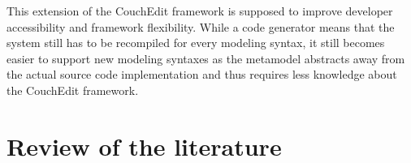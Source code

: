 \documentclass[10pt,a4paper,oneside]{scrartcl}
\newcommand\hint[2]{
\ifthenelse{\boolean{showhints}}{
\begin{center}
\colorbox{black!10}{
\begin{minipage}{.963\textwidth}
#2\hfill\textbf{#1}
\end{minipage}
}\end{center}}{}
}
\begin{document}
This extension of the CouchEdit framework is supposed to improve developer accessibility and framework flexibility. While a code generator means that the system still has to be recompiled for every modeling syntax, it still becomes easier to support new modeling syntaxes as the metamodel abstracts away from the actual source code implementation and thus requires less knowledge about the CouchEdit framework.


\section{Review of the literature}






\end{document}
